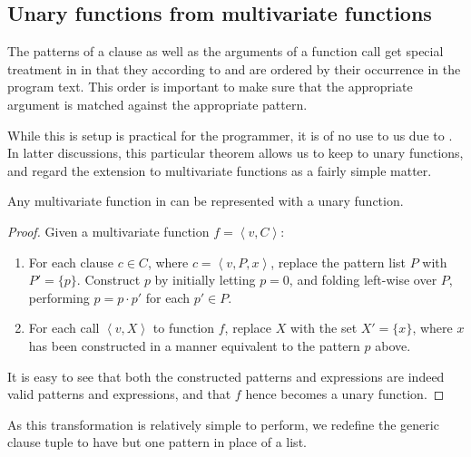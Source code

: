 \subsection{Unary functions from multivariate functions}

The patterns of a clause as well as the arguments of a function call get
special treatment in \D{} in that they according to
 and  are
ordered by their occurrence in the program text. This order is important to
make sure that the appropriate argument is matched against the appropriate
pattern. 

While this is setup is practical for the programmer, it is of no use to us due
to . In latter discussions, this
particular theorem allows us to keep to unary functions, and regard the
extension to multivariate functions as a fairly simple matter.

\begin{theorem}\label{theorem:multivariate-to-unary} Any multivariate function
in \D{} can be represented with a unary function.\end{theorem}

\begin{proof}

Given a multivariate function $f= \left\langle v,C \right\rangle$:

\begin{enumerate}

\item For each clause $c\in C$, where $c=\left\langle v,P,x \right\rangle$,
replace the pattern list $P$ with $P'=\{p\}$. Construct $p$ by initially
letting $p=0$, and folding left-wise over $P$, performing $p=p\cdot p'$ for
each $p'\in P$. 

\item For each call $\left\langle v, X\right\rangle$ to function $f$, replace
$X$ with the set $X'=\{x\}$, where $x$ has been constructed in a manner
equivalent to the pattern $p$ above.

\end{enumerate}

It is easy to see that both the constructed patterns and expressions are indeed
valid patterns and expressions, and that $f$ hence becomes a unary
function.\end{proof}

As this transformation is relatively simple to perform, we redefine the generic
clause tuple to have but one pattern in place of a list. 

